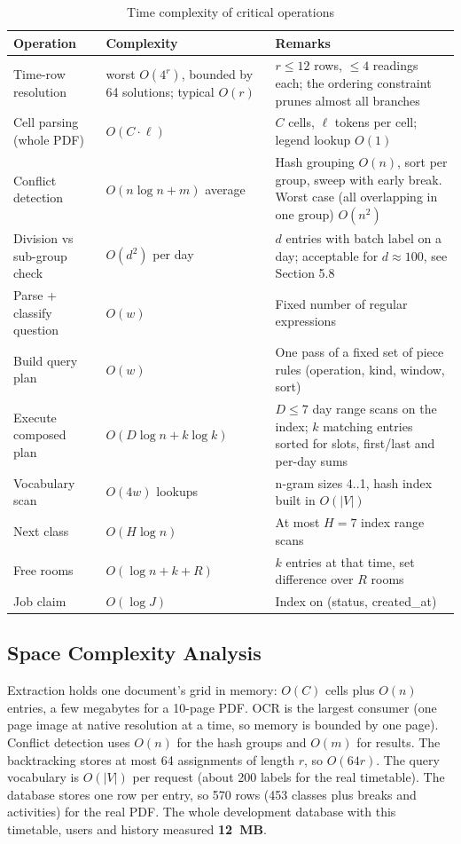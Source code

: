\begin{table}[H]
\centering
\caption{Time complexity of critical operations}
\label{tab:timecx}
\small
\begin{tabularx}{\textwidth}{@{}p{4.3cm}p{3.5cm}X@{}}
\toprule
\textbf{Operation} & \textbf{Complexity} & \textbf{Remarks}\\
\midrule
Time-row resolution & worst $O(4^{r})$, bounded by 64 solutions; typical $O(r)$ & $r \le 12$ rows, $\le 4$ readings each; the ordering constraint prunes almost all branches\\
Cell parsing (whole PDF) & $O(C \cdot \ell)$ & $C$ cells, $\ell$ tokens per cell; legend lookup $O(1)$\\
Conflict detection & $O(n \log n + m)$ average & Hash grouping $O(n)$, sort per group, sweep with early break. Worst case (all overlapping in one group) $O(n^2)$\\
Division vs sub-group check & $O(d^2)$ per day & $d$ entries with batch label on a day; acceptable for $d \approx 100$, see Section 5.8\\
Parse + classify question & $O(w)$ & Fixed number of regular expressions\\
Build query plan & $O(w)$ & One pass of a fixed set of piece rules (operation, kind, window, sort)\\
Execute composed plan & $O(D\log n + k\log k)$ & $D \leq 7$ day range scans on the index; $k$ matching entries sorted for slots, first/last and per-day sums\\
Vocabulary scan & $O(4w)$ lookups & n-gram sizes 4..1, hash index built in $O(|V|)$\\
Next class & $O(H \log n)$ & At most $H{=}7$ index range scans\\
Free rooms & $O(\log n + k + R)$ & $k$ entries at that time, set difference over $R$ rooms\\
Job claim & $O(\log J)$ & Index on (status, created\_at)\\
\bottomrule
\end{tabularx}
\end{table}

\subsection{Space Complexity Analysis}
Extraction holds one document's grid in memory: $O(C)$ cells plus $O(n)$ entries, a few megabytes
for a 10-page PDF. OCR is the largest consumer (one page image at native resolution at a time, so
memory is bounded by one page). Conflict detection uses $O(n)$ for the hash groups and $O(m)$ for
results. The backtracking stores at most 64 assignments of length $r$, so $O(64r)$. The query
vocabulary is $O(|V|)$ per request (about 200 labels for the real timetable). The database stores one
row per entry, so 570 rows (453 classes plus breaks and activities) for the real PDF. The whole
development database with this timetable, users and history measured \textbf{12~MB}.

